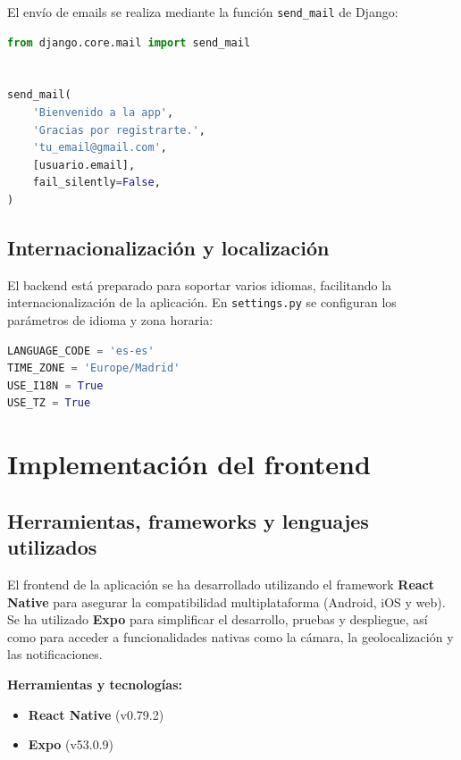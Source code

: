 El envío de emails se realiza mediante la función \texttt{send\_mail} de Django:


\begin{lstlisting}[language=Python, caption={Ejemplo de envío de email}]
from django.core.mail import send_mail


send_mail(
    'Bienvenido a la app',
    'Gracias por registrarte.',
    'tu_email@gmail.com',
    [usuario.email],
    fail_silently=False,
)
\end{lstlisting}


\subsection{Internacionalización y localización}

El backend está preparado para soportar varios idiomas, facilitando la internacionalización de la aplicación. En \texttt{settings.py} se configuran los parámetros de idioma y zona horaria:

\begin{lstlisting}[language=Python, caption={Internacionalización en settings.py}]
LANGUAGE_CODE = 'es-es'
TIME_ZONE = 'Europe/Madrid'
USE_I18N = True
USE_TZ = True
\end{lstlisting}




\section{Implementación del frontend}

\subsection{Herramientas, frameworks y lenguajes utilizados}

El frontend de la aplicación se ha desarrollado utilizando el framework \textbf{React Native} para asegurar la compatibilidad multiplataforma (Android, iOS y web). Se ha utilizado \textbf{Expo} para simplificar el desarrollo, pruebas y despliegue, así como para acceder a funcionalidades nativas como la cámara, la geolocalización y las notificaciones.


\textbf{Herramientas y tecnologías:}
\begin{itemize}
    \item \textbf{React Native} (v0.79.2)
    \item \textbf{Expo} (v53.0.9)
\end{itemize}

